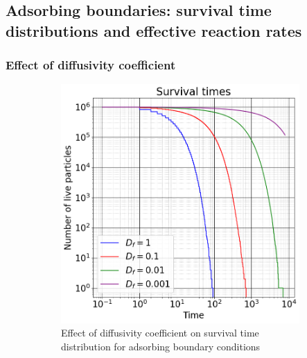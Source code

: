 \documentclass{article}
\begin{document}
\FloatBarrier  %
\subsection{Adsorbing boundaries: survival time distributions and effective reaction rates}
\subsubsection{Effect of diffusivity coefficient}
\begin{figure}[htbp]
    \centering
    \begin{subfigure}[b]{0.45\textwidth}
        \centering
        \includegraphics[width=\textwidth]{images/survTimeDistCompareDiff.png}
        \caption{Effect of diffusivity coefficient on survival time distribution for adsorbing boundary conditions}
    \end{subfigure}
    \hfill
    \begin{subfigure}[b]{0.45\textwidth}
        \centering

\end{subfigure}
\end{figure}
\end{document}
